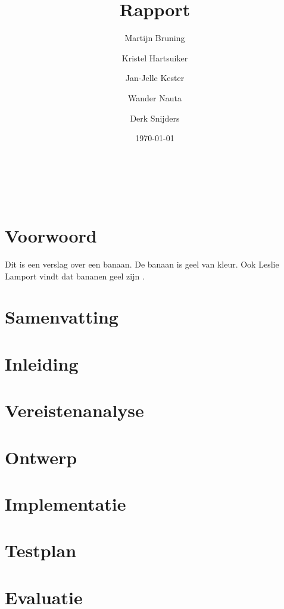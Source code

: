 \documentclass[twoside,openright,parskip]{scrreprt}
\title{Rapport}
\author{
     Martijn Bruning
\and Kristel Hartsuiker
\and Jan-Jelle Kester
\and Wander Nauta
\and Derk Snijders
}
\date{\today}
\begin{document}
\renewcommand*\rmdefault{ppl}
\renewcommand*\sfdefault{ppl}

\begin{titlepage}
	{\Huge \thetitle} \\
	\vfill
	\theauthor \\
	\thedate
\end{titlepage}

\chapter{Voorwoord}

Dit is een verslag over een \gls{banaan}. 
De banaan is geel van kleur. 
Ook Leslie Lamport vindt dat bananen geel zijn \cite{lamport94}.

\chapter{Samenvatting}

\lipsum

\tableofcontents

\chapter{Inleiding}

\lipsum

\chapter{Vereistenanalyse}

\lipsum

\chapter{Ontwerp}

\lipsum

\chapter{Implementatie}

\lipsum

\chapter{Testplan}

\lipsum

\chapter{Evaluatie}
\end{document}
